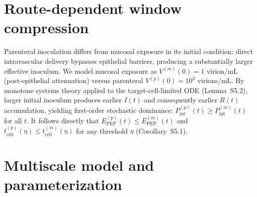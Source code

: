 \documentclass[10pt,letterpaper]{article}
\theoremstyle{definition}
\theoremstyle{remark}
\newcommand{\Pint}{P_{\text{int}}}
\newcommand{\Epep}{E_{\text{PEP}}}
\newcommand{\tcrit}{t_{\text{crit}}}
\begin{document}
\section*{Route-dependent window compression}

Parenteral inoculation differs from mucosal exposure in its initial condition: direct intravascular delivery bypasses epithelial barriers, producing a substantially larger effective inoculum. We model mucosal exposure as $V^{(m)}(0) = 1$ virion/mL (post-epithelial attenuation) versus parenteral $V^{(p)}(0) = 10^{3}$ virions/mL. By monotone systems theory applied to the target-cell-limited ODE (Lemma~S5.2), larger initial inoculum produces earlier $I(t)$ and consequently earlier $R(t)$ accumulation, yielding first-order stochastic dominance: $\Pint^{(p)}(t) \geq \Pint^{(m)}(t)$ for all $t$. It follows directly that $\Epep^{(p)}(t) \leq \Epep^{(m)}(t)$ and $\tcrit^{(p)}(\eta) \leq \tcrit^{(m)}(\eta)$ for any threshold $\eta$ (Corollary~S5.1).


\section*{Multiscale model and parameterization}
\end{document}

